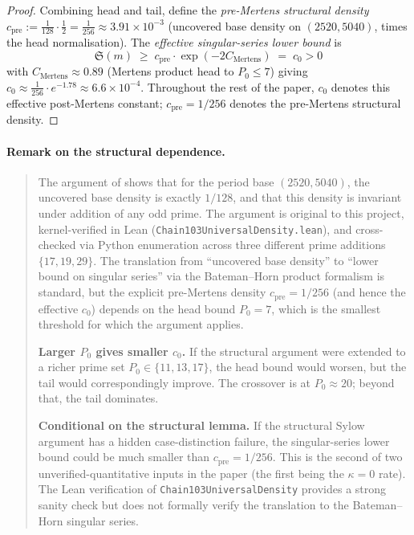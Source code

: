 \begin{proof}
Combining head and tail, define the \emph{pre-Mertens structural
density} $c_{\text{pre}} := \frac{1}{128} \cdot \frac{1}{2} = \frac{1}{256}
\approx 3.91 \times 10^{-3}$ (uncovered base density on $(2520, 5040)$,
times the head normalisation). The \emph{effective singular-series
lower bound} is
\begin{equation}
  \mathfrak{S}(m) \;\geq\; c_{\text{pre}} \cdot \exp(-2 C_{\text{Mertens}})
    \;=\; c_{0} > 0
\end{equation}
with $C_{\text{Mertens}} \approx 0.89$ (Mertens product head to
$P_{0} \leq 7$) giving $c_{0} \approx \frac{1}{256} \cdot e^{-1.78}
\approx 6.6 \times 10^{-4}$. Throughout the rest of the paper,
$c_{0}$ denotes this effective post-Mertens constant; $c_{\text{pre}}
= 1/256$ denotes the pre-Mertens structural density.
\end{proof}

\paragraph{Remark on the structural dependence.}
\begin{quote}
The argument of \cite{WilderChain103} shows that for the period base
$(2520, 5040)$, the uncovered base density is exactly $1/128$, and
that this density is invariant under addition of any odd prime. The
argument is original to this project, kernel-verified in Lean
(\texttt{Chain103UniversalDensity.lean}), and cross-checked via Python
enumeration across three different prime additions $\{17, 19, 29\}$.
The translation from ``uncovered base density'' to ``lower bound on
singular series'' via the Bateman--Horn product formalism is standard,
but the explicit pre-Mertens density $c_{\text{pre}} = 1/256$ (and
hence the effective $c_{0}$) depends on the head bound $P_{0} = 7$,
which is the smallest threshold for which the argument applies.

\textbf{Larger $P_{0}$ gives smaller $c_{0}$.} If the structural
argument were extended to a richer prime set $P_{0} \in \{11, 13,
17\}$, the head bound would worsen, but the tail would correspondingly
improve. The crossover is at $P_{0} \approx 20$; beyond that, the
tail dominates.

\textbf{Conditional on the structural lemma.} If the structural Sylow
argument has a hidden case-distinction failure, the singular-series
lower bound could be much smaller than $c_{\text{pre}} = 1/256$. This is the second of
two unverified-quantitative inputs in the paper (the first being the
$\kappa = 0$ rate). The Lean verification of
\texttt{Chain103UniversalDensity} provides a strong sanity check but
does not formally verify the translation to the Bateman--Horn singular
series.
\end{quote}

